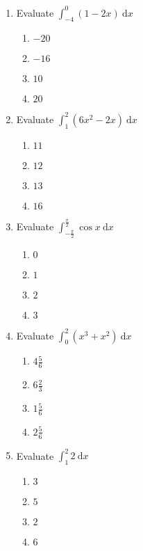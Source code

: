 \begin{multicols}{2}
\begin{enumerate}[label={\arabic*.}]
\begin{enumerate}[label={\Alph*.}]
      \end{enumerate}
    \item Evaluate \(\displaystyle \int_{-4}^{0} \left(1-2x\right)\ \mathrm{d}x\)
      \begin{enumerate}[label={\Alph*.}]
        \item \(-20\)
        \item \(-16\)
        \item \(10\)
        \item \(20\)
      \end{enumerate}
    \item Evaluate \(\displaystyle \int_{1}^{2} \left(6x^2-2x\right)\ \mathrm{d}x\)
      \begin{enumerate}[label={\Alph*.}]
        \item \(11\)
        \item \(12\)
        \item \(13\)
        \item \(16\)
      \end{enumerate}
    \item Evaluate \(\displaystyle \int_{-{\frac{\pi}{2}}}^{\frac{\pi}{2}} \cos{x}\ \mathrm{d}x\)
      \begin{enumerate}[label={\Alph*.}]
        \item \(0\)
        \item \(1\)
        \item \(2\)
        \item \(3\)
      \end{enumerate}
    \item Evaluate \(\displaystyle \int_{0}^{2} \left({x}^{3}+{x}^{2}\right)\ \mathrm{d}x\)
      \begin{enumerate}[label={\Alph*.}]
        \item \(4\frac{5}{6}\)
        \item \(6\frac{2}{3}\)
        \item \(1\frac{5}{6}\)
        \item \(2\frac{5}{6}\)
      \end{enumerate}
    \item Evaluate \(\displaystyle \int_{1}^{2} 2\ \mathrm{d}x\)
      \begin{enumerate}[label={\Alph*.}]
        \item \(3\)
        \item \(5\)
        \item \(2\)
        \item \(6\)
      \end{enumerate}

\end{enumerate}
\end{multicols}
